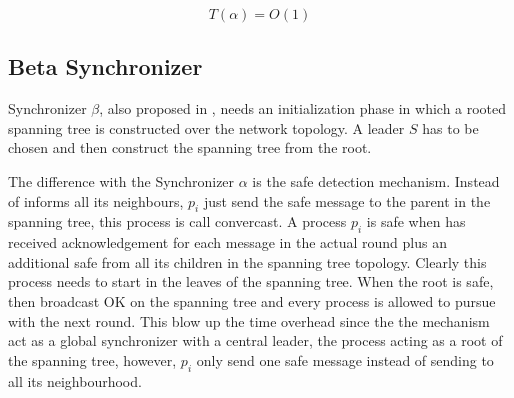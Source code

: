\begin{equation}
\label{ec:time-alpha}
 T(\alpha) = O(1) 
\end{equation}


\subsection{Beta Synchronizer}

Synchronizer $\beta$, also proposed in \cite{awerbuch1985complexity}, needs an initialization phase in which a rooted spanning tree is constructed over the network topology. A leader $S$ has to be chosen and then construct the spanning tree from the root.

The difference with the Synchronizer $\alpha$ is the safe detection mechanism. Instead of informs all its neighbours, $p_i$ just send the safe message to the parent in the spanning tree, this process is call convercast. A process $p_i$ is safe when has received acknowledgement for each message in the actual round plus an additional safe from all its children in the spanning tree topology. Clearly this process needs to start in the leaves of the spanning tree. When the root is safe, then broadcast OK on the spanning tree and every process is allowed to pursue with the next round. This blow up the time overhead since the the mechanism act as a global synchronizer with a central leader, the process acting as a root of the spanning tree, however, $p_i$ only send one safe message instead of sending to all its neighbourhood. 


